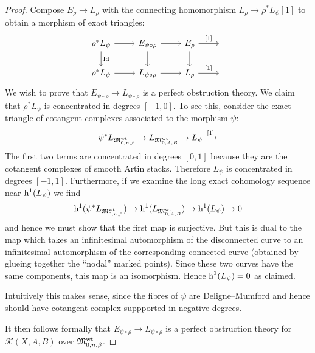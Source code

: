 \begin{proof} Compose $E_\rho \to L_\rho$ with the connecting homomorphism $L_\rho \to \rho^* L_\psi[1]$ to obtain a morphism of exact triangles:
\begin{equation} \label{E rho and E psi rho diagram}
\begin{tikzcd}
\rho^* L_\psi \ar[d,"\Id"] \ar[r] & E_{\psi \circ \rho} \ar[r] \ar[d] & E_\rho \ar[r,"{[1]}"] \ar[d] & \, \\
\rho^* L_\psi \ar[r] & L_{\psi \circ \rho} \ar[r] & L_\rho \ar[r,"{[1]}"] & \,
\end{tikzcd}
\end{equation}
We wish to prove that $E_{\psi \circ \rho} \to L_{\psi \circ \rho}$ is a perfect obstruction theory. We claim that $\rho^* L_{\psi}$ is concentrated in degrees $[-1,0]$. To see this, consider the exact triangle of cotangent complexes associated to the morphism $\psi$:
\begin{equation*} \psi^* L_{\mathfrak M_{0,n,\beta}^{\operatorname{wt}}} \rightarrow L_{\mathfrak M_{0,A,B}^{\operatorname{wt}}} \rightarrow L_\psi \xrightarrow{[1]} \end{equation*}
The first two terms are concentrated in degrees $[0,1]$ because they are the cotangent complexes of smooth Artin stacks. Therefore $L_\psi$ is concentrated in degrees $[-1,1]$. Furthermore, if we examine the long exact cohomology sequence near $\operatorname{h}^1(L_\psi)$ we find
\begin{equation*} \operatorname{h}^1(\psi^* L_{\mathfrak M_{0,n,\beta}^{\operatorname{wt}}}) \rightarrow \operatorname{h}^1(L_{\mathfrak M_{0,A,B}^{\operatorname{wt}}}) \rightarrow \operatorname{h}^1(L_\psi) \rightarrow 0 \end{equation*}
and hence we must show that the first map is surjective. But this is dual to the map which takes an infinitesimal automorphism of the disconnected curve to an infinitesimal automorphism of the corresponding connected curve (obtained by glueing together the ``nodal'' marked points). Since these two curves have the same components, this map is an isomorphism. Hence $\operatorname{h}^1(L_\psi) = 0$ as claimed.

\begin{aside} Intuitively this makes sense, since the fibres of $\psi$ are Deligne--Mumford and hence should have cotangent complex suppported in negative degrees. \end{aside}
It then follows formally that $E_{\psi \circ \rho} \to L_{\psi \circ \rho}$ is a perfect obstruction theory for $\mathcal{K}(X,A,B)$ over $\mathfrak M_{0,n,\beta}^{\operatorname{wt}}$. \end{proof}

